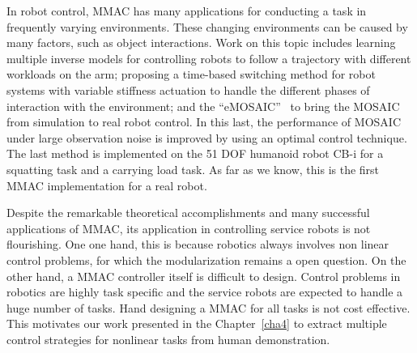 In robot control, MMAC has many applications for conducting a task in frequently varying environments. These changing environments can be caused by many factors, such as object interactions. Work on this topic includes \citet{petkos2006learning} learning multiple inverse models for controlling robots to follow a trajectory with different workloads on the arm; \citet{nakanishi2013spatio} proposing a time-based switching method for robot systems with variable stiffness actuation to handle the different phases of interaction with the environment; and the ``eMOSAIC''~\citep{sugimoto2012emosaic} to bring the MOSAIC from simulation to real robot control. In this last, the performance of MOSAIC under large observation noise is improved by using an optimal control technique. The last method is implemented on the 51 DOF humanoid robot CB-i for a squatting task and a carrying load task. As far as we know, this is the first MMAC implementation for a real robot.

Despite the remarkable theoretical accomplishments and many successful applications of MMAC, its application in controlling service robots is not flourishing. One one hand, this is because robotics always involves non linear control problems, for which the modularization remains a open question.
On the other hand, a MMAC controller itself is difficult to design. Control problems in robotics are highly task specific and the service robots are expected to handle a huge number of tasks. Hand designing a MMAC for all tasks is not cost effective. This motivates our work presented in the Chapter~\ref{cha4} to extract multiple control strategies for nonlinear tasks from human demonstration.



%
%

